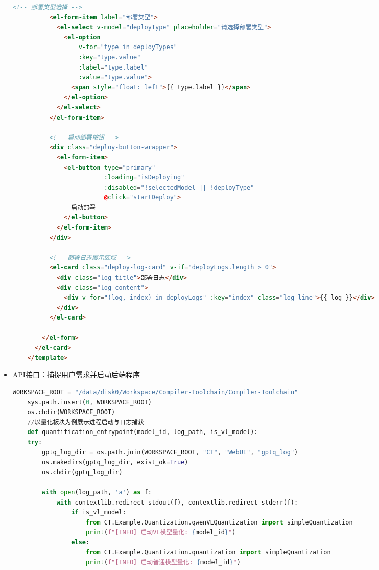 \documentclass[AutoFakeBold,AutoFakeSlant,language=chinese,degree=bachelor]{sustechthesis}
\begin{document}
\begin{itemize}
\begin{lstlisting}[language=HTML]
          <!-- 部署类型选择 -->
          <el-form-item label="部署类型">
            <el-select v-model="deployType" placeholder="请选择部署类型">
              <el-option
                  v-for="type in deployTypes"
                  :key="type.value"
                  :label="type.label"
                  :value="type.value">
                <span style="float: left">{{ type.label }}</span>
              </el-option>
            </el-select>
          </el-form-item>
    
          <!-- 启动部署按钮 -->
          <div class="deploy-button-wrapper">
            <el-form-item>
              <el-button type="primary"
                         :loading="isDeploying"
                         :disabled="!selectedModel || !deployType"
                         @click="startDeploy">
                启动部署
              </el-button>
            </el-form-item>
          </div>
    
          <!-- 部署日志展示区域 -->
          <el-card class="deploy-log-card" v-if="deployLogs.length > 0">
            <div class="log-title">部署日志</div>
            <div class="log-content">
              <div v-for="(log, index) in deployLogs" :key="index" class="log-line">{{ log }}</div>
            </div>
          </el-card>
    
        </el-form>
      </el-card>
    </template>
    \end{lstlisting}

    \item API接口：捕捉用户需求并启动后端程序
    \begin{lstlisting}[language=python]
    WORKSPACE_ROOT = "/data/disk0/Workspace/Compiler-Toolchain/Compiler-Toolchain"
    sys.path.insert(0, WORKSPACE_ROOT)
    os.chdir(WORKSPACE_ROOT) 
    //以量化板块为例展示进程启动与日志捕获
    def quantification_entrypoint(model_id, log_path, is_vl_model):
    try:
        gptq_log_dir = os.path.join(WORKSPACE_ROOT, "CT", "WebUI", "gptq_log")
        os.makedirs(gptq_log_dir, exist_ok=True)
        os.chdir(gptq_log_dir)
    
        with open(log_path, 'a') as f:
            with contextlib.redirect_stdout(f), contextlib.redirect_stderr(f):
                if is_vl_model:
                    from CT.Example.Quantization.qwenVLQuantization import simpleQuantization
                    print(f"[INFO] 启动VL模型量化: {model_id}")
                else:
                    from CT.Example.Quantization.quantization import simpleQuantization
                    print(f"[INFO] 启动普通模型量化: {model_id}")
                    

\end{lstlisting}
\end{itemize}
\end{document}
